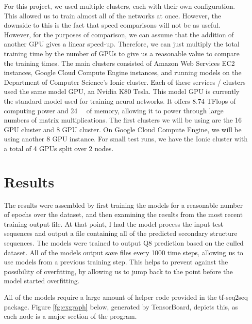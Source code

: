 \documentclass[pageno]{jpaper}
\begin{document}
\par
For this project, we used multiple clusters, each with their own configuration.  This allowed us to train almost all of the networks at once.  However, the downside to this is the fact that speed comparisons will not be as useful.  However, for the purposes of comparison, we can assume that the addition of another GPU gives a linear speed-up.  Therefore, we can just multiply the total training time by the number of GPUs to give us a reasonable value to compare the training times.  The main clusters consisted of Amazon Web Services EC2 instances, Google Cloud Compute Engine instances, and running models on the Department of Computer Science's Ionic cluster.  Each of these services / clusters used the same model GPU, an Nvidia K80 Tesla.  This model GPU is currently the standard model used for training neural networks.  It offers 8.74 TFlops of computing power and \SI{24}{\giga\byte} of memory, allowing it to power through large numbers of matrix multiplications.  The first clusters we will be using are the 16 GPU cluster and 8 GPU cluster.  On Google Cloud Compute Engine, we will be using another 8 GPU instance.  For small test runs, we have the Ionic cluster with a total of 4 GPUs split over 2 nodes.

\section{Results}
The results were assembled by first training the models for a reasonable number of epochs over the dataset, and then examining the results from the most recent training output file.  At that point, I had the model process the input test sequences and output a file containing all of the predicted secondary structure sequences.  The models were trained to output Q8 prediction based on the culled dataset.  All of the models output save files every 1000 time steps, allowing us to use models from a previous training step.  This helps to prevent against the possibility of overfitting, by allowing us to jump back to the point before the model started overfitting.

\par
All of the models require a large amount of helper code provided in the tf-seq2seq package.  Figure \ref{fg:exgraph} below, generated by TensorBoard, depicts this, as each node is a major section of the program.
\end{document}
